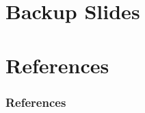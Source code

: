 \documentclass[12pt, dvipsnames, aspectratio=169]{beamer}
\begin{document}
\appendix

\section{Backup Slides}

\section{References}

\nocite{*}
\begin{frame}
  \frametitle{References}
  \sloppy%
  \printbibliography%
\end{frame}
\end{document}
